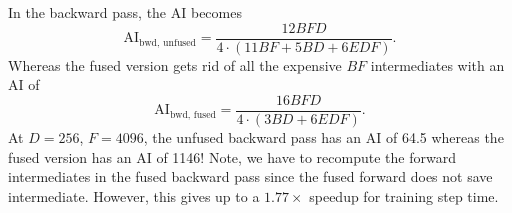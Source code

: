 \documentclass[11pt]{article}
\begin{document}
In the backward pass, the AI becomes
\[
\text{AI}_{\text{bwd, unfused}} = \frac{12BFD}{4 \cdot (11BF + 5BD + 6EDF)}.
\]
Whereas the fused version gets rid of all the expensive $BF$ intermediates with an AI of
\[
\text{AI}_{\text{bwd, fused}} = \frac{16BFD}{4 \cdot (3BD + 6EDF)}.
\]
At $D = 256$, $F = 4096$, the unfused backward pass has an AI of 64.5 whereas the fused version has an AI of 1146! Note, we have to recompute the forward intermediates in the fused backward pass since the fused forward does not save intermediate. However, this gives up to a $1.77\times$ speedup for training step time.
\end{document}

